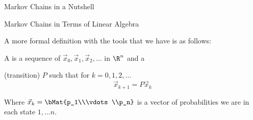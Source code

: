 \documentclass[xcoler=dvipsnames, aspectratio=169]{beamer}
\begin{document}
\begin{frame}{Markov Chains in a Nutshell}
{{\begin{tcolorbox}
{                        \begin{itemize}
                        \end{itemize}
                    }
                \end{tcolorbox}
            }
        }
    \end{frame}
    \begin{frame}{Markov Chains in Terms of Linear Algebra}
        \begin{tcolorbox}
            A more formal definition with the tools that we have is as follows:

            A  is a sequence of 
            $\vec{x}_0,\vec{x}_1,\vec{x}_2,\dots$ in $\R^{n}$ and a

             (transition)  $P$ such that for $k=0,1,2,\dots$
            \[
                \vec{x}_{k+1} = P\vec{x}_k
            \]
        \end{tcolorbox}\pause
        Where $\vec{x}_k = \bMat{p_1\\\vdots\\p_n}$ is a vector of probabilities we are in each
        state $1,\dots n$.
    \end{frame}
\end{document}
